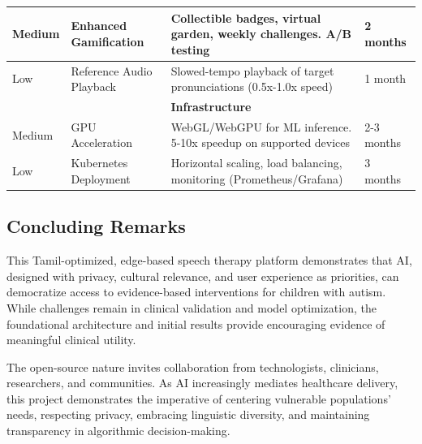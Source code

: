 \documentclass[12pt,a4paper]{article}
\begin{document}
\begin{table}[H]
\begin{tabular}{p{1cm}p{4cm}p{5.5cm}p{2cm}}
\hline
Medium & Enhanced Gamification & Collectible badges, virtual garden, weekly challenges. A/B testing & 2 months \\
\hline
Low & Reference Audio Playback & Slowed-tempo playback of target pronunciations (0.5x-1.0x speed) & 1 month \\
\midrule
\multicolumn{4}{c}{\textbf{Infrastructure}} \\
\midrule
Medium & GPU Acceleration & WebGL/WebGPU for ML inference. 5-10x speedup on supported devices & 2-3 months \\
\hline
Low & Kubernetes Deployment & Horizontal scaling, load balancing, monitoring (Prometheus/Grafana) & 3 months \\
\bottomrule
\end{tabular}
\end{table}

\subsection{Concluding Remarks}

This Tamil-optimized, edge-based speech therapy platform demonstrates that AI, designed with privacy, cultural relevance, and user experience as priorities, can democratize access to evidence-based interventions for children with autism. While challenges remain in clinical validation and model optimization, the foundational architecture and initial results provide encouraging evidence of meaningful clinical utility.

The open-source nature invites collaboration from technologists, clinicians, researchers, and communities. As AI increasingly mediates healthcare delivery, this project demonstrates the imperative of centering vulnerable populations' needs, respecting privacy, embracing linguistic diversity, and maintaining transparency in algorithmic decision-making.
\end{document}
